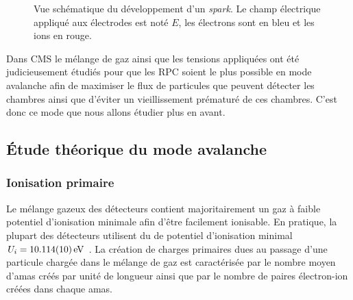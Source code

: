 \begin{figure}[ht!]
    \hfill
	\caption{Vue schématique du développement d'un \textit{spark}. Le champ électrique appliqué aux électrodes est noté $E$, les électrons sont en bleu et les ions en rouge.}
	\label{spark}
\end{figure}


Dans CMS le mélange de gaz ainsi que les tensions appliquées ont été judicieusement étudiés pour que les RPC soient le plus possible en mode avalanche afin de maximiser le flux de particules que peuvent détecter les chambres ainsi que d'éviter un vieillissement prématuré de ces chambres. C'est donc ce mode que nous allons étudier plus en avant.

\subsection{Étude théorique du mode avalanche}

\subsubsection{Ionisation primaire}
Le mélange gazeux des détecteurs contient majoritairement un gaz à faible potentiel d'ionisation minimale afin d'être facilement ionisable. En pratique, la plupart des détecteurs utilisent du  de potentiel d'ionisation minimal $U_{i}=\SI{10.114 \pm0.010}{\eV}$ \cite{Chimie:chimie}. La création de charges primaires dues au passage d'une particule chargée dans le mélange de gaz est caractérisée par le nombre moyen d'amas créés par unité de longueur ainsi que par le nombre de paires électron-ion créées dans chaque amas.

